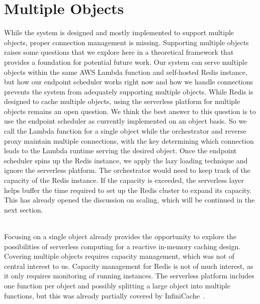 \section{Multiple Objects}
\label{sec:multiple_objects}
While the system is designed and mostly implemented to support multiple objects, proper connection management is missing. Supporting multiple objects raises some questions that we explore here in a theoretical framework that provides a foundation for potential future work. Our system can serve multiple objects within the same AWS Lambda function and self-hosted Redis instance, but how our endpoint scheduler works right now and how we handle connections prevents the system from adequately supporting multiple objects. While Redis is designed to cache multiple objects, using the serverless platform for multiple objects remains an open question. We think the best answer to this question is to use the endpoint scheduler as currently implemented on an object basis. So we call the Lambda function for a single object while the orchestrator and reverse proxy maintain multiple connections, with the key determining which connection leads to the Lambda runtime serving the desired object. Once the endpoint scheduler spins up the Redis instance, we apply the lazy loading technique and ignore the serverless platform. The orchestrator would need to keep track of the capacity of the Redis instance. If the capacity is exceeded, the serverless layer helps buffer the time required to set up the Redis cluster to expand its capacity. This has already opened the discussion on scaling, which will be continued in the next section.

~\\
Focusing on a single object already provides the opportunity to explore the possibilities of serverless computing for a reactive in-memory caching design. Covering multiple objects requires capacity management, which was not of central interest to us. Capacity management for Redis is not of much interest, as it only requires monitoring of running instances. The serverless platform includes one function per object and possibly splitting a large object into multiple functions, but this was already partially covered by InfiniCache~\cite{wang_infinicache_2020}.


